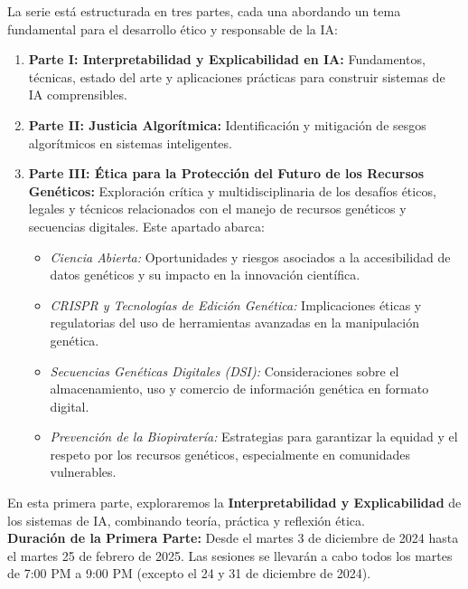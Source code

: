 \begin{titlepage}
\begin{center}
\begin{center}
    {\large La serie está estructurada en tres partes, cada una abordando un tema fundamental para el desarrollo ético y responsable de la IA:}
    \begin{enumerate}[label=\arabic*.]
        \item \textbf{Parte I: Interpretabilidad y Explicabilidad en IA:} Fundamentos, técnicas, estado del arte y aplicaciones prácticas para construir sistemas de IA comprensibles.
        \item \textbf{Parte II: Justicia Algorítmica:} Identificación y mitigación de sesgos algorítmicos en sistemas inteligentes.
        \item \textbf{Parte III: Ética para la Protección del Futuro de los Recursos Genéticos:} Exploración crítica y multidisciplinaria de los desafíos éticos, legales y técnicos relacionados con el manejo de recursos genéticos y secuencias digitales. Este apartado abarca:
        \begin{itemize}
            \item \textit{Ciencia Abierta:} Oportunidades y riesgos asociados a la accesibilidad de datos genéticos y su impacto en la innovación científica.
            \item \textit{CRISPR y Tecnologías de Edición Genética:} Implicaciones éticas y regulatorias del uso de herramientas avanzadas en la manipulación genética.
            \item \textit{Secuencias Genéticas Digitales (DSI):} Consideraciones sobre el almacenamiento, uso y comercio de información genética en formato digital.
            \item \textit{Prevención de la Biopiratería:} Estrategias para garantizar la equidad y el respeto por los recursos genéticos, especialmente en comunidades vulnerables.
        \end{itemize}

    \end{enumerate}
    
    {\large En esta primera parte, exploraremos la \textbf{Interpretabilidad y Explicabilidad} de los sistemas de IA, combinando teoría, práctica y reflexión ética.} \\[25pt]
    
    {\large \textbf{Duración de la Primera Parte:} Desde el martes 3 de diciembre de 2024 hasta el martes 25 de febrero de 2025. Las sesiones se llevarán a cabo todos los martes de 7:00 PM a 9:00 PM (excepto el 24 y 31 de diciembre de 2024).} \\[15pt]
    

\end{center}
\end{center}
\end{titlepage}
